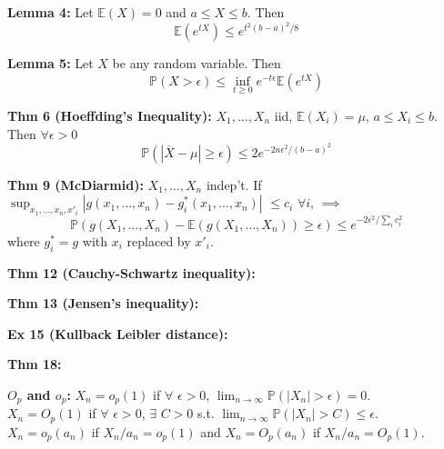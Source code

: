 \documentclass[10pt,twocolumn]{article}
\begin{document}
\textbf{Lemma 4:}
Let $\mathbb{E}(X) = 0$ and $a \leq X \leq b$. Then
\begin{equation}
    \mathbb{E}(e^{tX}) \leq e^{t^{2}(b-a)^{2}/8}
\end{equation}

\textbf{Lemma 5:}
Let $X$ be any random variable. Then
\begin{equation}
    \mathbb{P}(X>\epsilon) \leq \inf_{t \geq 0} e^{-t\epsilon} \mathbb{E}(e^{tX})
\end{equation}

\textbf{Thm 6 (Hoeffding's Inequality):}
$X_{1},\ldots,X_{n}$ iid, $\mathbb{E}(X_{i}) = \mu$, $a \leq X_{i} \leq b$. Then $\forall \epsilon >0$
\begin{equation}
    \mathbb{P}(|\overline{X} - \mu| \geq \epsilon) \leq 2e^{-2n\epsilon^{2}/(b-a)^{2}}
\end{equation}

\textbf{Thm 9 (McDiarmid):} $X_{1},\ldots,X_{n}$ indep't. If\\
$\sup_{x_{1},\ldots,x_{n},x'_{i}} \left| g(x_{1},\ldots,x_{n}) - g_{i}^{*}(x_{1},\ldots,x_{n}) \right|$ $\leq c_{i}$ $\forall i$, $\implies$
\begin{equation}
    \mathbb{P} \left(g(X_{1},\ldots,X_{n})-\mathbb{E}(g(X_{1},\ldots,X_{n})) \geq \epsilon \right) \leq e^{-2\epsilon^{2}/\sum_{i}c_{i}^{2}}
\end{equation}
where $g_{i}^{*} = g$ with $x_{i}$ replaced by $x'_{i}$.

\textbf{Thm 12 (Cauchy-Schwartz inequality):}

\textbf{Thm 13 (Jensen's inequality):}

\textbf{Ex 15 (Kullback Leibler distance):}

\textbf{Thm 18:}

\textbf{$O_{p}$ and $o_{p}$:} $X_{n} = o_{p}(1)$ if $\forall$ $\epsilon>0$, $\lim_{n\rightarrow\infty} \mathbb{P}(|X_{n}|>\epsilon) = 0$.\\
$X_{n} = O_{p}(1)$ if $\forall$ $\epsilon>0$, $\exists$ $C>0$ s.t. $\lim_{n\rightarrow\infty} \mathbb{P}(|X_{n}|>C) \leq \epsilon$. \\
$X_{n} = o_{p}(a_{n})$ if $X_{n}/a_{n} = o_{p}(1)$ and $X_{n} = O_{p}(a_{n})$ if $X_{n}/a_{n} = O_{p}(1).$
\end{document}
